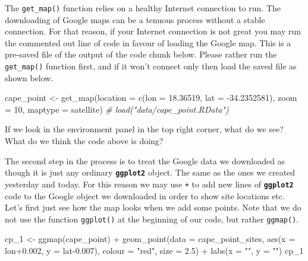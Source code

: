 \documentclass[
]{book}
\newenvironment{Shaded}{\begin{snugshade}}{\end{snugshade}}
\newcommand{\AttributeTok}[1]{\textcolor[rgb]{0.77,0.63,0.00}{#1}}
\newcommand{\CommentTok}[1]{\textcolor[rgb]{0.56,0.35,0.01}{\textit{#1}}}
\newcommand{\DecValTok}[1]{\textcolor[rgb]{0.00,0.00,0.81}{#1}}
\newcommand{\FloatTok}[1]{\textcolor[rgb]{0.00,0.00,0.81}{#1}}
\newcommand{\FunctionTok}[1]{\textcolor[rgb]{0.00,0.00,0.00}{#1}}
\newcommand{\NormalTok}[1]{#1}
\newcommand{\OtherTok}[1]{\textcolor[rgb]{0.56,0.35,0.01}{#1}}
\newcommand{\SpecialCharTok}[1]{\textcolor[rgb]{0.00,0.00,0.00}{#1}}
\newcommand{\StringTok}[1]{\textcolor[rgb]{0.31,0.60,0.02}{#1}}
\begin{document}
The \texttt{get\_map()} function relies on a healthy Internet connection to run. The downloading of Google maps can be a tenuous process without a stable connection. For that reason, if your Internet connection is not great you may run the commented out line of code in favour of loading the Google map. This is a pre-saved file of the output of the code chunk below. Please rather run the \texttt{get\_map()} function first, and if it won't connect only then load the saved file as shown below.

\begin{Shaded}
\begin{Highlighting}[]
\NormalTok{cape\_point }\OtherTok{\textless{}{-}} \FunctionTok{get\_map}\NormalTok{(}\AttributeTok{location =} \FunctionTok{c}\NormalTok{(}\AttributeTok{lon =} \FloatTok{18.36519}\NormalTok{, }\AttributeTok{lat =} \SpecialCharTok{{-}}\FloatTok{34.2352581}\NormalTok{),}
                        \AttributeTok{zoom =} \DecValTok{10}\NormalTok{, }\AttributeTok{maptype =} \StringTok{\textquotesingle{}satellite\textquotesingle{}}\NormalTok{)}
\CommentTok{\# load("data/cape\_point.RData")}
\end{Highlighting}
\end{Shaded}

If we look in the environment panel in the top right corner, what do we see? What do we think the code above is doing?

The second step in the process is to treat the Google data we downloaded as though it is just any ordinary \textbf{\texttt{ggplot2}} object. The same as the ones we created yesterday and today. For this reason we may use \texttt{+} to add new lines of \textbf{\texttt{ggplot2}} code to the Google object we downloaded in order to show site locations etc. Let's first just see how the map looks when we add some points. Note that we do not use the function \texttt{ggplot()} at the beginning of our code, but rather \texttt{ggmap()}.

\begin{Shaded}
\begin{Highlighting}[]
\NormalTok{cp\_1 }\OtherTok{\textless{}{-}} \FunctionTok{ggmap}\NormalTok{(cape\_point) }\SpecialCharTok{+}
  \FunctionTok{geom\_point}\NormalTok{(}\AttributeTok{data =}\NormalTok{ cape\_point\_sites, }\FunctionTok{aes}\NormalTok{(}\AttributeTok{x =}\NormalTok{ lon}\FloatTok{+0.002}\NormalTok{, }\AttributeTok{y =}\NormalTok{ lat}\FloatTok{{-}0.007}\NormalTok{), }
             \AttributeTok{colour =} \StringTok{"red"}\NormalTok{, }\AttributeTok{size =}  \FloatTok{2.5}\NormalTok{) }\SpecialCharTok{+}
  \FunctionTok{labs}\NormalTok{(}\AttributeTok{x =} \StringTok{""}\NormalTok{, }\AttributeTok{y =} \StringTok{""}\NormalTok{)}
\NormalTok{cp\_1}
\end{Highlighting}
\end{Shaded}
\end{document}
